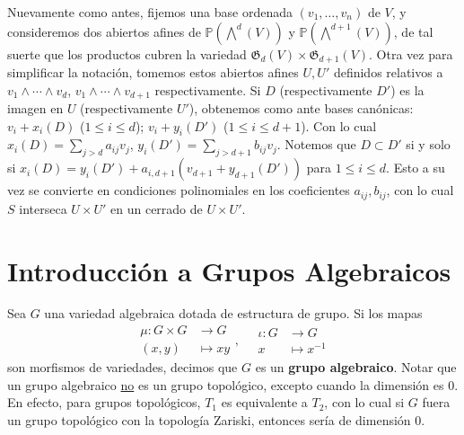 \documentclass[spanish,10pt]{amsart}
\theoremstyle{definition}
\theoremstyle{remark}
\numberwithin{equation}{section}
\begin{document}
Nuevamente como antes, fijemos una base ordenada $(v_1, \ldots, v_n)$ de $V$, y consideremos dos abiertos afines de $\mathbb{P} (\bigwedge^d (V))$ y $\mathbb{P} (\bigwedge^{d+1} (V))$, de tal suerte que los productos cubren la variedad $\mathfrak G _d (V) \times \mathfrak G _{d+1} (V)$. Otra vez para simplificar la notación, tomemos estos abiertos afines $U, U'$ definidos relativos a $v_1 \wedge \cdots \wedge v_d$, $v_1 \wedge \cdots \wedge v_{d+1}$ respectivamente. Si $D$ (respectivamente $D'$) es la imagen en $U$ (respectivamente $U'$), obtenemos como ante bases canónicas: $v_i + x_i (D)$ ($1 \leq i \leq d$); $v_i + y_i (D')$ ($1\leq i \leq d+ 1$). Con lo cual $x_i (D) = \sum_{j > d} a_{ij} v_j$, $y_i (D') = \sum_{j > d+1} b_{ij} v_j$. Notemos que $D \subset D'$ si y solo si $x_i (D) = y_i (D') + a_{i, d+1} (v_{d+1} + y_{d+1} (D'))$ para $1 \leq i \leq d$. Esto a su vez se convierte en condiciones polinomiales en los coeficientes $a_{ij}, b_{ij}$, con lo cual $S$ interseca $U \times U'$ en un cerrado de $U \times U'$.





















\section{Introducción a Grupos Algebraicos}

Sea $G$ una variedad algebraica dotada de estructura de grupo. Si los mapas
\[
    \begin{array}{ll}
    \mu : G \times G &\longrightarrow G \\
    (x,y) &\longmapsto xy
    \end{array}, \quad
    \begin{array}{ll}
    \iota : G &\longrightarrow G \\
    x &\longmapsto x^{-1}
    \end{array}
\]
son morfismos de variedades, decimos que $G$ es un \textbf{grupo algebraico}. Notar que un grupo algebraico \underline{no} es un grupo topológico, excepto cuando la dimensión es $0$. En efecto, para grupos topológicos, $T_1$ es equivalente a $T_2$, con lo cual si $G$ fuera un grupo topológico con la topología Zariski, entonces sería de dimensión $0$.
\end{document}
